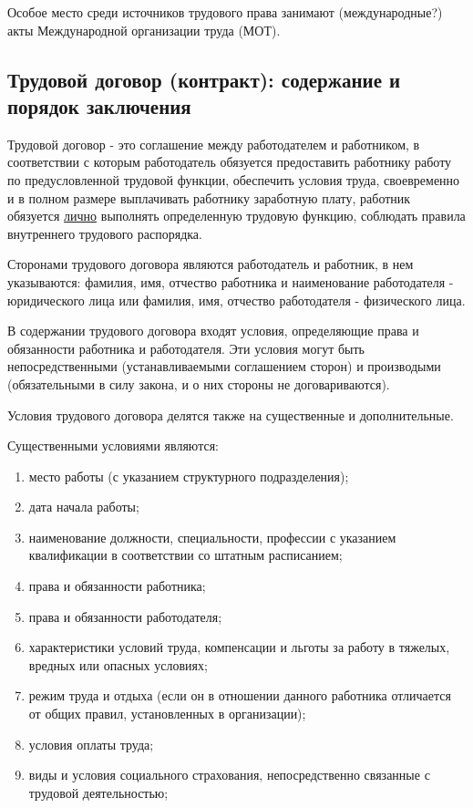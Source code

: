 Особое место среди источников трудового права занимают (международные?) акты Международной организации труда (МОТ).

\subsection{Трудовой договор (контракт): содержание и порядок заключения}

Трудовой договор - это соглашение между работодателем и работником, в соответствии с которым работодатель обязуется предоставить работнику работу по предусловленной трудовой функции, обеспечить условия труда, своевременно и в полном размере выплачивать работнику заработную плату, работник обязуется \underline{лично} выполнять определенную трудовую функцию, соблюдать правила внутреннего трудового распорядка.

Сторонами трудового договора являются работодатель и работник, в нем указываются: фамилия, имя, отчество работника и наименование работодателя - юридического лица или фамилия, имя, отчество работодателя - физического лица.

В содержании трудового договора входят условия, определяющие права и обязанности работника и работодателя. Эти условия могут быть непосредственными (устанавливаемыми соглашением сторон) и производыми (обязательными в силу закона, и о них стороны не договариваются).

Условия трудового договора делятся также на существенные и дополнительные. 

Существенными условиями являются:
\begin{enumerate}
	\item место работы (с указанием структурного подразделения);
	\item дата начала работы;
	\item наименование должности, специальности, профессии с указанием квалификации в соответствии со штатным расписанием;
	\item права и обязанности работника;
	\item права и обязанности работодателя;
	\item характеристики условий труда, компенсации и льготы за работу в тяжелых, вредных или опасных условиях;
	\item режим труда и отдыха (если он в отношении данного работника отличается от общих правил, установленных в организации);
	\item условия оплаты труда;
	\item виды и условия социального страхования, непосредственно связанные с трудовой деятельностью;
\end{enumerate}

